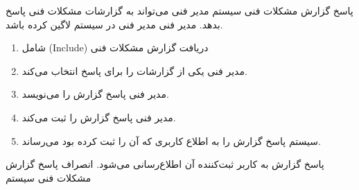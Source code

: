 {
	\usecase
	{پاسخ گزارش مشکلات فنی سیستم}
	{}
	{مدیر فنی می‌تواند به گزارشات مشکلات فنی پاسخ بدهد.}
	{مدیر فنی}
	{}
	{مدیر فنی در سیستم لاگین کرده باشد.}
	{
		\vspace*{-0.6cm}
		\begin{enumerate}
			\item 
شامل (Include) دریافت گزارش مشکلات فنی
			\item
مدیر فنی یکی از گزارشات را برای پاسخ انتخاب می‌کند.
			\item
مدیر فنی پاسخ گزارش را می‌نویسد.
			\item
مدیر فنی پاسخ گزارش را ثبت می‌کند.

\item 
سیستم پاسخ گزارش را به اطلاع کاربری که آن را ثبت کرده بود می‌رساند.
		\end{enumerate}
	}
	{پاسخ گزارش به کاربر ثبت‌کننده آن اطلاع‌رسانی می‌شود.}
	{
		انصراف
	}
	{
پاسخ گزارش مشکلات فنی سیستم
	}

}